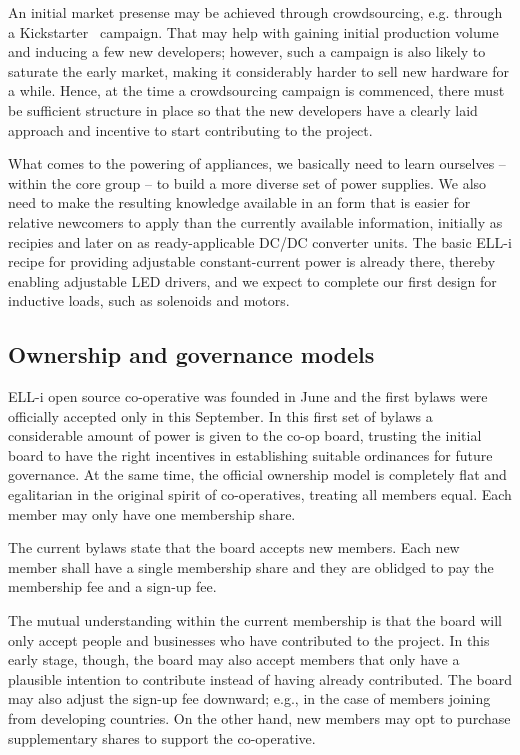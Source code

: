 \documentclass[draft,a4paper]{siamltex}
\begin{document}
An initial market presense may be achieved through crowdsourcing,
e.g. through a Kickstarter~\cite{Kickstarter} campaign.  That may help
with gaining initial production volume and inducing a few new
developers; however, such a campaign is also likely to saturate the
early market, making it considerably harder to sell new hardware for a
while.  Hence, at the time a crowdsourcing campaign is commenced,
there must be sufficient structure in place so that the new developers
have a clearly laid approach and incentive to start contributing to
the project.

What comes to the powering of appliances, we basically need to learn
ourselves -- within the core group -- to build a more diverse set of
power supplies.  We also need to make the resulting knowledge
available in an form that is easier for relative newcomers to apply
than the currently available information, initially as recipies and
later on as ready-applicable DC/DC converter units.  The basic ELL-i
recipe for providing adjustable constant-current power is already
there, thereby enabling adjustable LED drivers, and we expect to
complete our first design for inductive loads, such as solenoids and
motors.

\subsection{Ownership and governance models}
\label{ssec:ownership}

ELL-i open source co-operative was founded in June and the first
bylaws were officially accepted only in this September.  In this first
set of bylaws a considerable amount of power is given to the co-op
board, trusting the initial board to have the right incentives in
establishing suitable ordinances for future governance.  At the same
time, the official ownership model is completely flat and egalitarian
in the original spirit of co-operatives, treating all members equal.
Each member may only have one membership share.

The current bylaws state that the board accepts new members.  Each new
member shall have a single membership share and they are oblidged to
pay the membership fee and a sign-up fee.

The mutual understanding within the current membership is that the
board will only accept people and businesses who have contributed to
the project.  In this early stage, though, the board may also accept
members that only have a plausible intention to contribute instead of
having already contributed.  The board may also adjust the sign-up fee
downward; e.g., in the case of members joining from developing
countries.   On the other hand, new members may opt to purchase
supplementary shares to support the co-operative.
\end{document}
